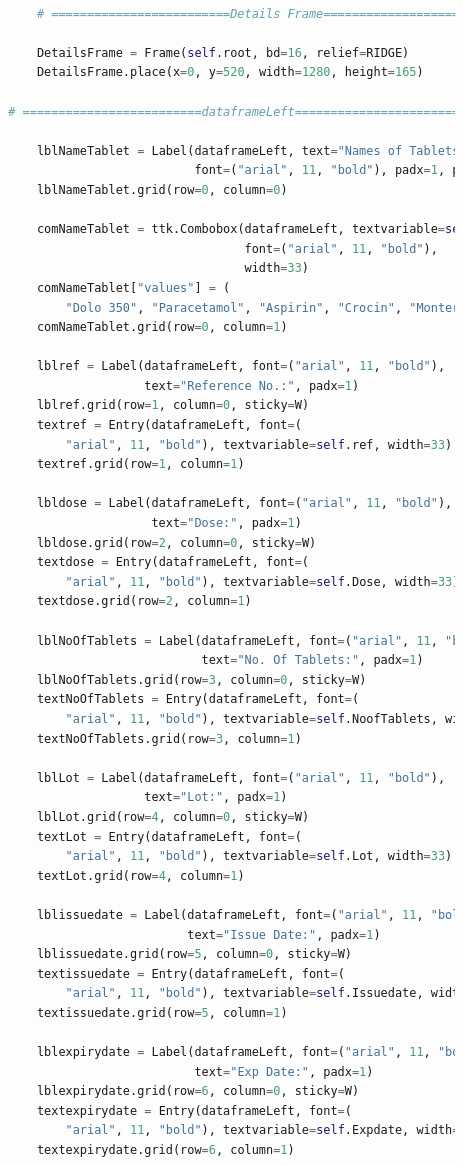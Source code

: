 \documentclass{article}
\begin{document}
\begin{lstlisting}[language=Python, caption=Hospital Management.py]
	
			# =========================Details Frame========================
	
			DetailsFrame = Frame(self.root, bd=16, relief=RIDGE)
			DetailsFrame.place(x=0, y=520, width=1280, height=165)
	
		# =========================dataframeLeft========================
	
			lblNameTablet = Label(dataframeLeft, text="Names of Tablets",
								  font=("arial", 11, "bold"), padx=1, pady=4)
			lblNameTablet.grid(row=0, column=0)
	
			comNameTablet = ttk.Combobox(dataframeLeft, textvariable=self.Nameoftablets, state="readonly",
										 font=("arial", 11, "bold"),
										 width=33)
			comNameTablet["values"] = (
				"Dolo 350", "Paracetamol", "Aspirin", "Crocin", "Monter LC", "Neprocin")
			comNameTablet.grid(row=0, column=1)
	
			lblref = Label(dataframeLeft, font=("arial", 11, "bold"),
						   text="Reference No.:", padx=1)
			lblref.grid(row=1, column=0, sticky=W)
			textref = Entry(dataframeLeft, font=(
				"arial", 11, "bold"), textvariable=self.ref, width=33)
			textref.grid(row=1, column=1)
	
			lbldose = Label(dataframeLeft, font=("arial", 11, "bold"),
							text="Dose:", padx=1)
			lbldose.grid(row=2, column=0, sticky=W)
			textdose = Entry(dataframeLeft, font=(
				"arial", 11, "bold"), textvariable=self.Dose, width=33)
			textdose.grid(row=2, column=1)
	
			lblNoOfTablets = Label(dataframeLeft, font=("arial", 11, "bold"),
								   text="No. Of Tablets:", padx=1)
			lblNoOfTablets.grid(row=3, column=0, sticky=W)
			textNoOfTablets = Entry(dataframeLeft, font=(
				"arial", 11, "bold"), textvariable=self.NoofTablets, width=33)
			textNoOfTablets.grid(row=3, column=1)
	
			lblLot = Label(dataframeLeft, font=("arial", 11, "bold"),
						   text="Lot:", padx=1)
			lblLot.grid(row=4, column=0, sticky=W)
			textLot = Entry(dataframeLeft, font=(
				"arial", 11, "bold"), textvariable=self.Lot, width=33)
			textLot.grid(row=4, column=1)
	
			lblissuedate = Label(dataframeLeft, font=("arial", 11, "bold"),
								 text="Issue Date:", padx=1)
			lblissuedate.grid(row=5, column=0, sticky=W)
			textissuedate = Entry(dataframeLeft, font=(
				"arial", 11, "bold"), textvariable=self.Issuedate, width=33)
			textissuedate.grid(row=5, column=1)
	
			lblexpirydate = Label(dataframeLeft, font=("arial", 11, "bold"),
								  text="Exp Date:", padx=1)
			lblexpirydate.grid(row=6, column=0, sticky=W)
			textexpirydate = Entry(dataframeLeft, font=(
				"arial", 11, "bold"), textvariable=self.Expdate, width=33)
			textexpirydate.grid(row=6, column=1)
	

\end{lstlisting}
\end{document}
